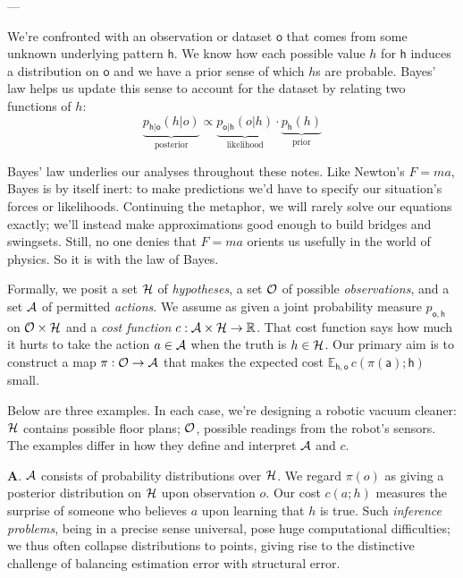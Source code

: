 \documentclass[11pt, justified]{tufte-book}
\newcommand{\gre}{\color{mgre}}
\newcommand{\samsubsubsection}[1]{
   \vspace{0.1cm}
   \par\noindent{\hspace{-2cm}\normalsize \sc \gre #1} ---
}
\newcommand{\Ee}{\mathbb{E}}\newcommand{\eE}{\mathcal{E}}
\newcommand{\Rr}{\mathbb{R}}\newcommand{\rR}{\mathcal{R}}
\newcommand{\sfa}{\mathsf{a}}\newcommand{\fra}{\mathcal{a}}
\newcommand{\sfh}{\mathsf{h}}\newcommand{\frh}{\mathcal{h}}
\newcommand{\sfo}{\mathsf{o}}\newcommand{\fro}{\mathcal{o}}
\theoremstyle{definition}
\begin{document}
      \samsubsubsection{conceptual framework}
      We're confronted with an observation or dataset $\sfo$ that comes from
      some unknown underlying pattern $\sfh$.  We know how each possible value
      $h$ for $\sfh$ induces a distribution on $\sfo$ and we have a prior sense
      of which $h$s are probable.  Bayes' law helps us update this sense to
      account for the dataset by relating two functions of $h$:
      $$
        \underbrace{p_{\sfh|\sfo}(h|o)}_{\text{posterior}}
        \propto
        \underbrace{p_{\sfo|\sfh}(o|h)}_{\text{likelihood}}
        \cdot
        \underbrace{p_{\sfh}(h)}_{\text{prior}}
      $$

      Bayes' law underlies our analyses throughout these notes.
      Like Newton's $F=ma$, Bayes is by itself inert: to make predictions we'd
      have to specify our situation's forces or likelihoods.  Continuing the
      metaphor, we will rarely solve our equations exactly; we'll instead make
      approximations good enough to build bridges and swingsets.  Still, no one
      denies that $F=ma$ orients us usefully in the world of physics.  So it is
      with the law of Bayes.

      Formally, we posit a set $\mathcal{H}$ of \emph{hypotheses}, a set $\mathcal{O}$ of
      possible \emph{observations}, and a set $\mathcal{A}$ of permitted
      \emph{actions}.  We assume as given a joint probability measure
      $p_{\sfo,\sfh}$ on $\mathcal{O}\times \mathcal{H}$ and a \emph{cost function}
      $c:\aA\times \hH \to \Rr$.
      That cost function says how much it hurts to take the action $a\in \mathcal{A}$
      when the truth is $h\in \mathcal{H}$.
      Our primary aim is to construct a map $\pi:\mathcal{O}\to \mathcal{A}$ that makes the
      expected cost $\Ee_{\sfh,\sfo} \, c(\pi(\sfa); \sfh)$ small.

      Below are three examples.  In each case, we're designing a robotic vacuum
      cleaner: $\mathcal{H}$ contains possible floor plans; $\mathcal{O}$, 
      possible readings from the robot's sensors.  The examples differ in how
      they define and interpret $\mathcal{A}$ and $c$.

      \textbf{A}.  $\mathcal{A}$ consists of probability distributions over $\mathcal{H}$. We
      regard $\pi(o)$ as giving a posterior distribution on $\mathcal{H}$ upon
      observation $o$.  Our cost $c(a;h)$ measures the surprise of someone who
      believes $a$ upon learning that $h$ is true. 
      Such \emph{inference problems}, being in a precise sense universal, pose
      huge computational difficulties; we thus often collapse distributions to
      points, giving rise to the distinctive challenge of balancing estimation
      error with structural error.
\end{document}
